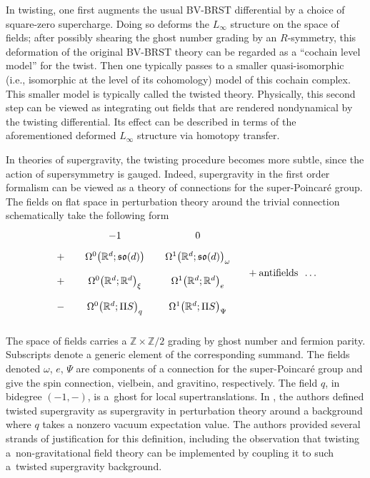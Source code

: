 \documentclass[10pt,a4paper]{amsart}
\numberwithin{equation}{section}
\theoremstyle{definition}
\def\R{\mathbb{R}}
\def\Z{\mathbb{Z}}
\begin{document}
In twisting, one first augments the usual BV-BRST differential by a choice of square-zero supercharge. Doing so deforms the $L_\infty$ structure on the space of fields; after possibly shearing the ghost number grading by an $R$-symmetry, this deformation of the original BV-BRST theory can be regarded as a ``cochain level model'' for the twist. Then one typically passes to a smaller quasi-isomorphic (i.e., isomorphic at the level of its cohomology) model of this cochain complex. This smaller model is typically called the twisted theory. Physically, this second step can be viewed as integrating out fields that are rendered nondynamical by the twisting differential. Its effect can be described in terms of the aforementioned deformed $L_\infty$ structure via homotopy transfer.

In theories of supergravity, the twisting procedure becomes more subtle, since the action of supersymmetry is gauged. Indeed, supergravity in the first order formalism can be viewed as a theory of connections for the super-Poincar\'e group. The fields on flat space in perturbation theory around the trivial connection schematically take the following form
\begin{equation}\label{table:BV sugra fields}
\begin{tikzcd}[column sep=small, row sep=tiny]
& -1 & 0 & \\
+ & \Omega^0 \bigl(\R^d; \mathfrak{so}(d) \bigr) & \Omega^1 \bigl(\R^d; \mathfrak{so}(d) \bigr)_\omega \\
+ & \Omega^0 \bigl(\R^d; \R^d \bigr)_\xi & \Omega^1 \bigl(\R^d; \R^d\bigr)_e \\
- & \Omega^0 \bigl(\R^d; \Pi S \bigr)_q & \Omega^1 \bigl(\R^d; \Pi S\bigr)_\Psi \\
\end{tikzcd} + \text{antifields \ \dots}
\end{equation}

The space of fields carries a $\Z\times \Z/2$ grading by ghost number and fermion parity. Subscripts denote a generic element of the corresponding summand. The fields denoted $\omega$, $e$, $\Psi$ are components of a connection for the super-Poincar\'e group and give the spin connection, vielbein, and gravitino, respectively. The field $q$, in bidegree $(-1, -)$, is a~ghost for local supertranslations. In \cite{CostelloLi}, the authors defined twisted supergravity as supergravity in perturbation theory around a background where $q$ takes a nonzero vacuum expectation value. The authors provided several strands of justification for this definition, including the observation that twisting a~non-gravitational field theory can be implemented by coupling it to such a~twisted supergravity background.
\end{document}
